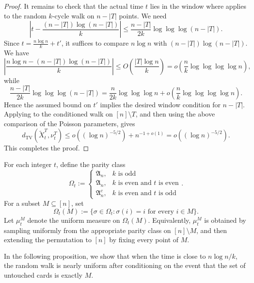 \begin{proof}
    It remains to check that the actual time $t$ lies in the window where 
    applies to the random $k$-cycle walk on $n-|T|$ points. We need
    \begin{equation}
        \left|
        t-\frac{(n-|T|)\log(n-|T|)}{k}
        \right|
        \leq
        \frac{n-|T|}{2k}\log\log\log (n-|T|).
    \end{equation}
    Since $t=\frac{n\log n}{k}+t'$, it suffices to compare $n\log n$ with $(n-|T|)\log(n-|T|)$. We have
    \begin{equation}
        \left|
        \frac{n\log n-(n-|T|)\log(n-|T|)}{k}
        \right|
        \leq
        O\left(\frac{|T|\log n}{k}\right)
        =
        o\left(\frac{n}{k}\log\log\log\log n\right),
    \end{equation}
    while
    \begin{equation}
        \frac{n-|T|}{2k}\log\log\log(n-|T|)
        =
        \frac{n}{2k}\log\log\log n
        +
        o\left(\frac{n}{k}\log\log\log\log n\right).
    \end{equation}
    Hence the assumed bound on $t'$ implies the desired window condition for $n-|T|$. Applying  to the conditioned walk on $[n]\setminus T$, and then using
    the above comparison of the Poisson parameters, gives
    $$
        d_{\mathrm{TV}}\left(\widetilde X_t^T,\nu_t^T\right)
        \leq
        o\left((\log n)^{-5/2}\right)+n^{-1+o(1)}
        =
        o\left((\log n)^{-5/2}\right).
    $$
    This completes the proof.
\end{proof}

For each integer \(t\), define the parity class
$$
\Omega_t:=
\begin{cases}
\mathfrak A_n, & k \text{ is odd}\\
\mathfrak A_n, & k \text{ is even and } t \text{ is even}\\
\mathfrak A_n^c, & k \text{ is even and } t \text{ is odd}
\end{cases}.
$$
For a subset \(M\subseteq [n]\), set
$$
    \Omega_t(M):=\{\sigma\in \Omega_t:\sigma(i)=i\text{ for every }i\in M\}.
$$
Let \(\mu_t^M\) denote the uniform measure on \(\Omega_t(M)\). Equivalently, \(\mu_t^M\) is obtained by sampling uniformly from the appropriate parity class on \([n]\setminus M\), and then extending the permutation to \([n]\) by fixing every point of \(M\).

In the following proposition, we show that when the time is close to $n\log n/k$, the random walk is nearly uniform after conditioning on the event that the set of untouched cards is exactly $M$.

